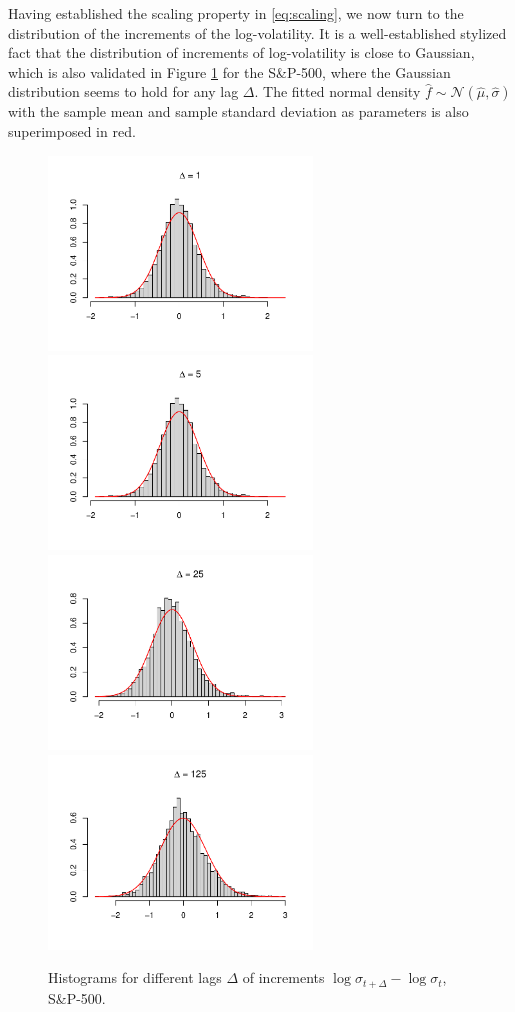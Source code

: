  Having established the scaling property in \eqref{eq:scaling}, we now turn to the distribution of the increments of the log-volatility. It is a well-established stylized fact that the distribution of increments of log-volatility is close to Gaussian, which is also validated in Figure \ref{fig:histograms} for the S\&P-500, where the Gaussian distribution seems to hold for any lag $\Delta$. The fitted normal density $\hat{f}\sim \mathcal{N}(\hat{\mu}, \hat{\sigma})$ with the sample mean and sample standard deviation as parameters is also superimposed in red.
 \begin{figure}[H]
    \centering
    \includegraphics[scale=0.5, width = 7cm]{fig/img/RealizedLib/histograms/histogram1.pdf}
    \includegraphics[scale=0.5, width = 7cm]{fig/img/RealizedLib/histograms/histogram5.pdf}\hfill
    \includegraphics[scale=0.5, width = 7cm]{fig/img/RealizedLib/histograms/histogram25.pdf}
    \includegraphics[scale=0.5, width = 7cm]{fig/img/RealizedLib/histograms/histogram125.pdf}
    \caption{Histograms for different lags $\Delta$ of increments $\log\sigma_{t+\Delta}-\log\sigma_{t}$, S\&P-500.}
    \label{fig:histograms}
\end{figure}
